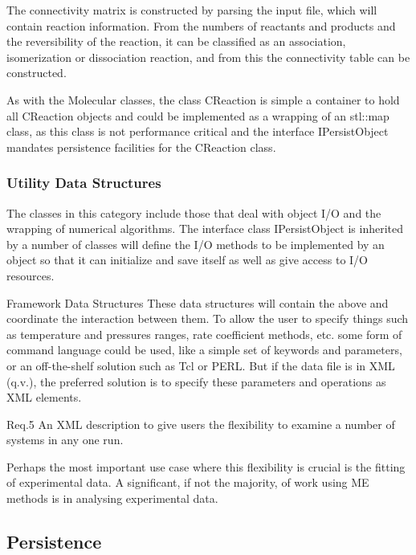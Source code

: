 The connectivity matrix is constructed by parsing the input file, which will contain reaction information. From the numbers of reactants and products and the reversibility of the reaction, it can be classified as an association, isomerization or dissociation reaction, and from this the connectivity table can be constructed.

As with the Molecular classes, the class CReaction is simple a container to hold all CReaction objects and could be implemented as a wrapping of an stl::map class, as this class is not performance critical and the interface IPersistObject mandates persistence facilities for the CReaction class.

\subsubsection{Utility Data Structures
}\label{sec:UtilityDataStructures
}

The classes in this category include those that deal with object I/O and the wrapping of numerical algorithms. The interface class IPersistObject is inherited by a number of classes will define the I/O methods to be implemented by an object so that it can initialize and save itself as well as give access to I/O resources.

Framework Data Structures
These data structures will contain the above and coordinate the interaction between them. To allow the user to specify things such as temperature and pressures ranges, rate coefficient methods, etc. some form of command language could be used, like a simple set of keywords and parameters, or an off-the-shelf solution such as Tcl or PERL. But if the data file is in XML (q.v.), the preferred solution is to specify these parameters and operations as XML elements. 

Req.5 An XML description to give users the flexibility to examine a number of systems in any one run.

Perhaps the most important use case where this flexibility is crucial is the fitting of experimental data. A significant, if not the majority, of work using ME methods is in analysing experimental data.

\subsection{Persistence}\label{sec:Persistence}



